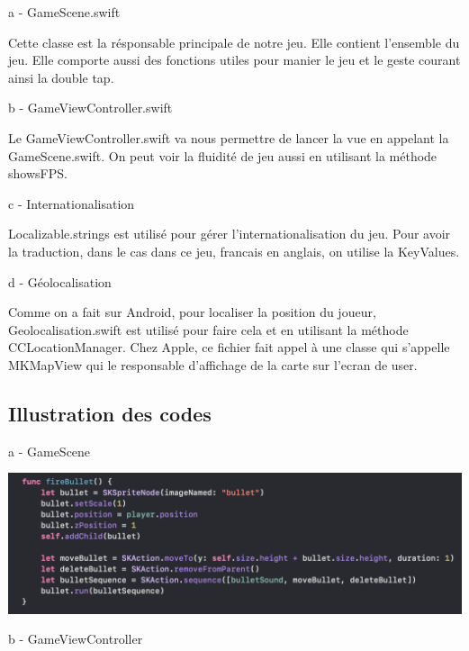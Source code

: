 \documentclass{rapportECL}
\begin{document}
a - GameScene.swift

Cette classe est la résponsable principale de notre jeu. Elle contient l'ensemble du jeu. Elle comporte aussi des fonctions utiles pour manier le jeu et le geste courant ainsi la double tap.


b - GameViewController.swift

Le GameViewController.swift va nous permettre de lancer la vue en appelant la GameScene.swift. On peut voir la fluidité de jeu aussi en utilisant la méthode showsFPS.\newline


c - Internationalisation

Localizable.strings est utilisé pour gérer l'internationalisation du jeu. Pour avoir la traduction, dans le cas dans ce jeu, francais en anglais, on utilise la KeyValues.\newline


d - Géolocalisation

Comme on a fait sur Android, pour localiser la position du joueur, Geolocalisation.swift est utilisé pour faire cela et en utilisant la méthode CCLocationManager\cite{GooglemapsiOS}. Chez Apple\cite{iOS}, ce fichier fait appel à une classe qui s'appelle MKMapView qui le responsable d'affichage de la carte sur l'ecran de user.



\subsection{Illustration des codes}
 a - GameScene
 
 \begin{center}
    \includegraphics[scale = 0.5]{logos/FireBullet.png}
\end{center}

 b - GameViewController
 
\end{document}
